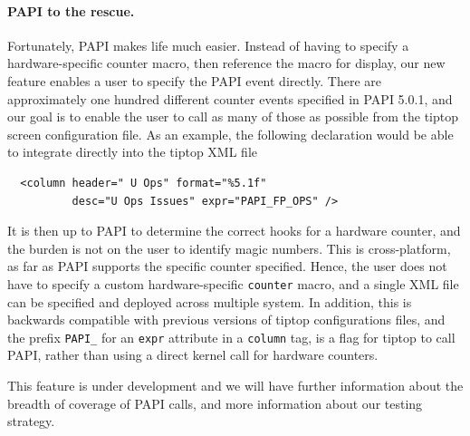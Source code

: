 \paragraph{PAPI to the rescue.}
Fortunately, PAPI makes life much easier.
Instead of having to specify a hardware-specific counter macro, then reference the macro for display, our new feature enables a user to specify the PAPI event directly.
There are approximately one hundred different counter events specified in PAPI 5.0.1, and our goal is to enable the user to call as many of those as possible from the tiptop screen configuration file.
As an example, the following declaration would be able to integrate directly into the tiptop XML file
\begin{verbatim}
  <column header=" U Ops" format="%5.1f"
          desc="U Ops Issues" expr="PAPI_FP_OPS" />
\end{verbatim}
It is then up to PAPI to determine the correct hooks for a hardware counter, and the burden is not on the user to identify magic numbers.
This is cross-platform, as far as PAPI supports the specific counter specified.
Hence, the user does not have to specify a custom hardware-specific \texttt{counter} macro, and a single XML file can be specified and deployed across multiple system.
In addition, this is backwards compatible with previous versions of tiptop configurations files, and the prefix \texttt{PAPI\_} for an \texttt{expr} attribute in a \texttt{column} tag, is a flag for tiptop to call PAPI, rather than using a direct kernel call for hardware counters.

This feature is under development and we will have further information about the breadth of coverage of PAPI calls, and more information about our testing strategy.